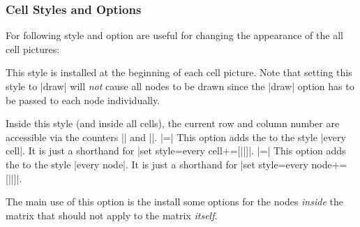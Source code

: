 \begin{codeexample}[]
\end{codeexample}

\begin{codeexample}[]
\end{codeexample}


\subsubsection{Cell Styles and Options}

For following style and option are useful for changing the appearance
of the all cell pictures:
\begin{itemize}
   This style is installed at the beginning of
  each cell picture. Note that setting this style to |draw| will
  \emph{not} cause all nodes to be drawn since the |draw| option has
  to be passed to each node individually.

  Inside this style (and inside all cells), the current row and column
  number are accessible via the counters |\pgfmatrixcurrentrow| and
  |\pgfmatrixcurrentcolumn|. 
  |=| This option adds the
   to the style |every cell|. It is just a shorthand for
  |set style={{every cell}+=[||]}|.
  |=| This option adds the
   to the style |every node|. It is just a shorthand for
  |set style={{every node}+=[||]}|.

  The main use of this option is the install some options for the
  nodes \emph{inside} the matrix that should not apply to the matrix
  \emph{itself}. 
\end{itemize}

